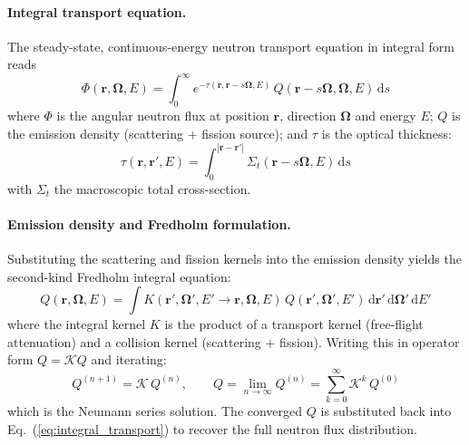 \documentclass[11pt,a4paper]{article}
\begin{document}
\paragraph{Integral transport equation.}
The steady-state, continuous-energy neutron transport equation in
integral form reads
\begin{equation}
\Phi(\mathbf{r},\boldsymbol{\Omega},E)
= \int_{0}^{\infty}
  e^{-\tau(\mathbf{r},\mathbf{r}-s\boldsymbol{\Omega},E)}\,
  Q(\mathbf{r}-s\boldsymbol{\Omega},\boldsymbol{\Omega},E)\,\mathrm{d}s
\label{eq:integral_transport}
\end{equation}
where $\Phi$ is the angular neutron flux at position $\mathbf{r}$,
direction $\boldsymbol{\Omega}$ and energy $E$; $Q$ is the emission
density (scattering $+$ fission source); and $\tau$ is the optical
thickness:
\begin{equation}
\tau(\mathbf{r},\mathbf{r}',E)
= \int_{0}^{|\mathbf{r}-\mathbf{r}'|}
  \Sigma_t(\mathbf{r}-s\boldsymbol{\Omega},E)\,\mathrm{d}s
\end{equation}
with $\Sigma_t$ the macroscopic total cross-section.

\paragraph{Emission density and Fredholm formulation.}
Substituting the scattering and fission kernels into the emission
density yields the second-kind Fredholm integral equation:
\begin{equation}
Q(\mathbf{r},\boldsymbol{\Omega},E)
= \int K(\mathbf{r}',\boldsymbol{\Omega}',E'
        \to \mathbf{r},\boldsymbol{\Omega},E)\,
  Q(\mathbf{r}',\boldsymbol{\Omega}',E')\,
  \mathrm{d}\mathbf{r}'\,\mathrm{d}\boldsymbol{\Omega}'\,\mathrm{d}E'
\end{equation}
where the integral kernel $K$ is the product of a transport kernel
(free-flight attenuation) and a collision kernel (scattering $+$
fission). Writing this in operator form $Q = \mathcal{K}Q$ and
iterating:
\begin{equation}
Q^{(n+1)} = \mathcal{K}\,Q^{(n)},
\qquad
Q = \lim_{n\to\infty} Q^{(n)}
  = \sum_{k=0}^{\infty}\mathcal{K}^k\,Q^{(0)}
\end{equation}
which is the Neumann series solution. The converged $Q$ is substituted
back into Eq.~(\ref{eq:integral_transport}) to recover the full neutron
flux distribution.
\end{document}
